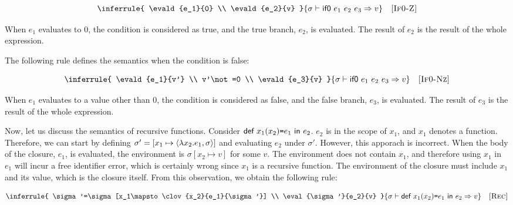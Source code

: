 \vspace{-1em}

\[
  \inferrule
  {
    \evald{e_1}{0} \\
    \evald{e_2}{v}
  }
  { \evald{\eifz{e_1}{e_2}{e_3}}{v} }
  \quad\textsc{[If0-Z]}
\]

When $e_1$ evaluates to $0$, the condition is considered as true, and the true
branch, $e_2$, is evaluated. The result of $e_2$ is the result of the whole
expression.

The following rule defines the semantics when the condition is false:


\vspace{-1em}

\[
\inferrule
  {
    \evald{e_1}{v'} \\
    v'\not=0 \\
    \evald{e_3}{v}
  }
  { \evald{\eifz{e_1}{e_2}{e_3}}{v} }
  \quad\textsc{[If0-Nz]}
\]

When $e_1$ evaluates to a value other than $0$, the condition is considered as
false, and the false
branch, $e_3$, is evaluated. The result of $e_3$ is the result of the whole
expression.

Now, let us discuss the semantics of recursive functions.
Consider $\textsf{def}\ x_1(x_2)\texttt{=} e_1\ \textsf{in}\ e_2$.
$e_2$ is in the scope of $x_1$, and $x_1$ denotes a function. Therefore, we can
start by defining $\sigma'=[x_1\mapsto\langle\lambda x_2.e_1,\sigma\rangle]$ and evaluating
$e_2$ under $\sigma'$. However, this apporach is incorrect. When the body of the
closure, $e_1$, is evaluated, the environment is $\sigma[x_2\mapsto v]$ for some
$v$. The environment does not contain $x_1$, and therefore using $x_1$ in
$e_1$ will incur a free identifier error, which is certainly wrong since $x_1$
is a recursive function. The environment of the closure must include $x_1$ and
its value, which is the closure itself. From this observation, we obtain the
following rule:


\vspace{-1em}

\[
  \inferrule
  {
    \sigma'=\sigma[x_1\mapsto\clov{x_2}{e_1}{\sigma'}] \\
    \eval{\sigma'}{e_2}{v}
  }
  { \evald{\erec{x_1}{x_2}{e_1}{e_2}}{v} }
  \quad\textsc{[Rec]}
\]

